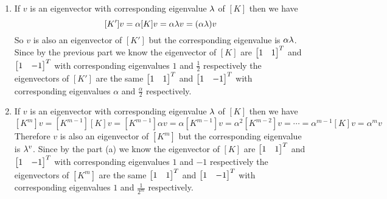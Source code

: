 \documentclass[a4paper, 11pt]{article}
\begin{document}
{\begin{enumerate}[label=(\alph*)]
            Now the vectors $\mat{1& 1}^T$ and $\mat{1& -1}^T$ are orthogonal but they are not normalized vectors. Hence consider the vectors $\frac1{\sqrt{2}}\mat{1& 1}^T$ and $\frac{1}{\sqrt{2}}\mat{1& -1}^T$. They are orthogonal and also they are normalized. Hence they are orthonormal. Hence we claim $[Q]=\frac1{\sqrt{2}}\mat{1 & 1\\ 1& -1} $. Since we already knew the eigenvalues we also have $[\Lm]=\mat{1 & 0\\ 0 & \frac12}$. First we will show that $[Q^T]=[Q^{-1}]$. Now $\det[Q]=\lt(\frac{1}{\sqrt{2}}\rt)^2(1\times (-1)-1\times 1)=\frac12\times (-2)=-1$. Now $$[Q^{-1}]=\frac{1}{\det[Q]}\mat{-\frac1{\sqrt{2}} & -\frac1{\sqrt{2}}\\ -\frac1{\sqrt{2}}& \frac1{\sqrt{2}}}=\frac1{\sqrt{2}}\mat{1 &1\\ 1&-1}=[Q^T] $$So now $$[Q\Lm Q^{-1}]=\frac12\mat{1& 1\\ 1&-1}\mat{1 & 0\\ 0& 0.5}\mat{1& 1\\ 1&-1}=\frac12\mat{1 & 0.5 \\ 1& - 0.5}\mat{1& 1\\ 1&-1}=\frac12\mat{1.5& 0.5\\ 0.5 & 1.5}=\mat{0.75&0.25\\ 0.25&0.75}=[K]$$
        \item If $v$ is an eigenvector with corresponding eigenvalue $\lambda$ of $[K]$ then we have $$[K']v=\alpha[K]v=\alpha \lambda v=(\alpha\lambda )v$$So $v$ is also an eigenvector of $[K']$ but the corresponding eigenvalue is $\alpha \lambda$. Since by the previous part we know the eigenvector of $[K]$ are $\mat{1&1}^T$  and $\mat{1& -1}^T$ with corresponding eigenvalues $1$ and $\frac12$ respectively the eigenvectors of $[K']$ are the same $\mat{1&1}^T$  and $\mat{1& -1}^T$ with corresponding eigenvalues $\alpha$ and $\frac{\alpha}2$ respectively.
        \item If $v$ is an eigenvector with corresponding eigenvalue $\lambda$ of $[K]$ then we have $$[K^m]v=[K^{m-1}][K]v=[K^{m-1}]\alpha v=\alpha [K^{m-1}]v=\alpha^2[K^{m-2}]v=\cdots = \alpha^{m-1}[K]v=\alpha^m v$$Therefore $v$ is also an eigenvector of $[K^m]$ but the corresponding eigenvalue is $\lambda^v$. Since by the part (a) we know the eigenvector of $[K]$ are $\mat{1&1}^T$  and $\mat{1& -1}^T$ with corresponding eigenvalues $1$ and $-1$ respectively the eigenvectors of $[K^m]$ are the same $\mat{1&1}^T$  and $\mat{1& -1}^T$ with corresponding eigenvalues $1$ and $\frac1{2^m}$ respectively.
    \end{enumerate}		
}
\end{document}
